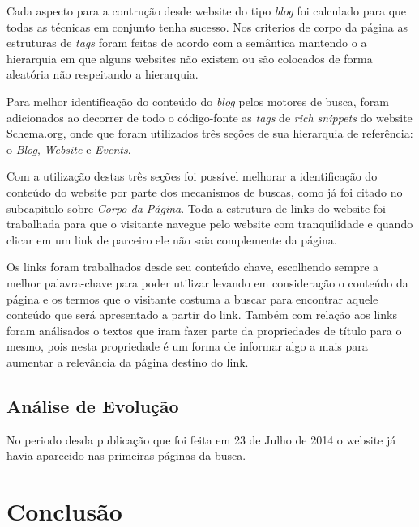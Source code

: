 \documentclass[
	12pt,				%
	openright,			%
	twoside,			%
	a4paper,			%
	english,			%
	french,				%
	spanish,			%
	brazil				%
	]{abntex2}
\begin{document}
Cada aspecto para a contrução desde website do tipo \textit{blog} foi calculado para que todas as técnicas em conjunto tenha sucesso. Nos criterios de corpo da página as estruturas de \textit{tags} foram feitas de acordo com a semântica mantendo o a hierarquia em que alguns websites não existem ou são colocados de forma aleatória não respeitando a hierarquia.

Para melhor identificação do conteúdo do \textit{blog} pelos motores de busca, foram adicionados ao decorrer de todo o código-fonte as \textit{tags} de \textit{rich snippets} do website Schema.org, onde que foram utilizados três seções de sua hierarquia de referência: o \textit{Blog}, \textit{Website} e \textit{Events}.

Com a utilização destas três seções foi possível melhorar a identificação do conteúdo do website por parte dos mecanismos de buscas, como já foi citado no subcapitulo sobre \textit{Corpo da Página}. Toda a estrutura de links do website foi trabalhada para que o visitante navegue pelo website com tranquilidade e quando clicar em um link de parceiro ele não saia complemente da página.

Os links foram trabalhados desde seu conteúdo chave, escolhendo sempre a melhor palavra-chave para poder utilizar levando em consideração o conteúdo da página e os termos que o visitante costuma a buscar para encontrar aquele conteúdo que será apresentado a partir do link. Também com relação aos links foram análisados o textos que iram fazer parte da propriedades de título para o mesmo, pois nesta propriedade é um forma de informar algo a mais para aumentar a relevância da página destino do link.



\section{Análise de Evolução}

No periodo desda publicação que foi feita em 23 de Julho de 2014 o website já havia aparecido nas primeiras páginas da busca.



\chapter*[Conclusão]{Conclusão}
\end{document}
